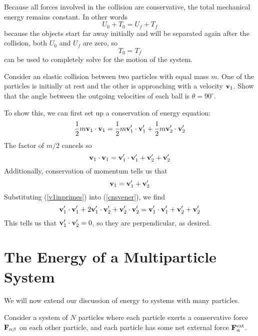 Because all forces involved in the collision are conservative, the total mechanical energy remains constant. In other words
\[ U_0 + T_0 = U_f + T_f\]
because the objects start far away initially and will be separated again after the collision, both $U_0$ and $U_f$ are zero, so
\[ T_0 = T_f \]
can be used to completely solve for the motion of the system. 
\begin{example}
    Consider an elastic collision between two particles with equal mass $m$. One of the particles is initially at rest and the other is approaching with a velocity $\mathbf{v}_1$. Show that the angle between the outgoing velocities of each ball is $\theta = 90^\circ$.

    To show this, we can first set up a conservation of energy equation:
    \[ \frac{1}{2}m\mathbf{v}_1 \cdot \mathbf{v}_1 = \frac{1}{2}m\mathbf{v}_1' \cdot \mathbf{v}_1' + \frac{1}{2}m\mathbf{v}_2' \cdot \mathbf{v}_2'\]
    The factor of $m/2$ cancels so
    \begin{equation} \label{cnsvener}
        \mathbf{v}_1 \cdot \mathbf{v}_1 = \mathbf{v}_1' \cdot \mathbf{v}_1' + \mathbf{v}_2' + \mathbf{v}_2'
    \end{equation}
    Additionally, conservation of momentum tells us that
    \begin{equation} \label{v1inprimes}
        \mathbf{v}_1 = \mathbf{v}_1' + \mathbf{v}_2' 
    \end{equation}
    Substituting (\ref{v1inprimes}) into (\ref{cnsvener}), we find
    \[ \mathbf{v}_1' \cdot \mathbf{v}_1' + 2\mathbf{v}_1' \cdot \mathbf{v}_2' + \mathbf{v}_2' \cdot \mathbf{v}_2' = \mathbf{v}_1' \cdot \mathbf{v}_1' + \mathbf{v}_2' + \mathbf{v}_2'\]
    This tells us that $\mathbf{v}_1' \cdot \mathbf{v}_2' = 0$, so they are perpendicular, as desired.
\end{example}
\section{The Energy of a Multiparticle System}
We will now extend our discussion of energy to systems with many particles.

Consider a system of $N$ particles where each particle exerts a conservative force $\mathbf{F}_{\alpha\beta}$ on each other particle, and each particle has some net external force $\mathbf{F}_\alpha^\text{ext}$. 

